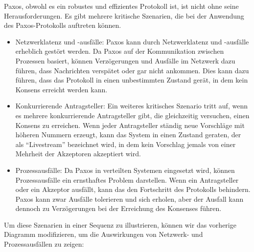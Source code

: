 Paxos, obwohl es ein robustes und effizientes Protokoll ist, ist nicht ohne seine Herausforderungen. Es gibt mehrere kritische Szenarien, die bei der Anwendung des Paxos-Protokolls auftreten können.
\begin{itemize}
\item Netzwerklatenz und -ausfälle: Paxos kann durch Netzwerklatenz und -ausfälle erheblich gestört werden. Da Paxos auf der Kommunikation zwischen Prozessen basiert, können Verzögerungen und Ausfälle im Netzwerk dazu führen, dass Nachrichten verspätet oder gar nicht ankommen. Dies kann dazu führen, dass das Protokoll in einen unbestimmten Zustand gerät, in dem kein Konsens erreicht werden kann.
\item Konkurrierende Antragsteller: Ein weiteres kritisches Szenario tritt auf, wenn es mehrere konkurrierende Antragsteller gibt, die gleichzeitig versuchen, einen Konsens zu erreichen. Wenn jeder Antragsteller ständig neue Vorschläge mit höheren Nummern erzeugt, kann das System in einen Zustand geraten, der als \enquote{Livestream} bezeichnet wird, in dem kein Vorschlag jemals von einer Mehrheit der Akzeptoren akzeptiert wird.
\item Prozessausfälle: Da Paxos in verteilten Systemen eingesetzt wird, können Prozessausfälle ein ernsthaftes Problem darstellen. Wenn ein Antragsteller oder ein Akzeptor ausfällt, kann das den Fortschritt des Protokolls behindern. Paxos kann zwar Ausfälle tolerieren und sich erholen, aber der Ausfall kann dennoch zu Verzögerungen bei der Erreichung des Konsenses führen.
\end{itemize}

Um diese Szenarien in einer Sequenz zu illustrieren, können wir das vorherige Diagramm modifizieren, um die Auswirkungen von Netzwerk- und Prozessausfällen zu zeigen:


